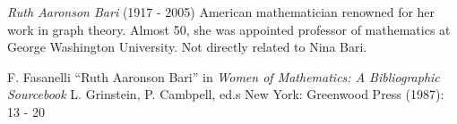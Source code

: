 \documentclass[12pt]{article}
\begin{document}
\emph{Ruth Aaronson Bari} (1917 - 2005) American mathematician renowned for her work in graph theory. Almost 50, she was appointed professor of mathematics at George Washington University. Not directly related to Nina Bari.

\begin{thebibliography}{1}
 F. Fasanelli ``Ruth Aaronson Bari'' in {\it Women of Mathematics: A Bibliographic Sourcebook} L. Grinstein, P. Cambpell, ed.s New York: Greenwood Press (1987): 13 - 20
\end{thebibliography}
\end{document}
